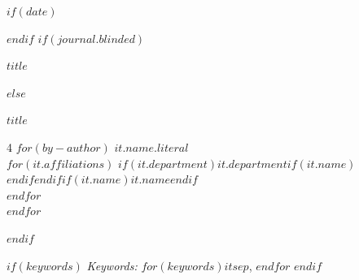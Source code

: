 

\def\spacingset#1{\renewcommand{\baselinestretch}%
{#1}\small\normalsize} \spacingset{1}



$if(date)$
\date{$date$}
$endif$
$if(journal.blinded)$
\spacingset{.8}
\bigskip
\bigskip
\bigskip
\begin{center}
  {\LARGE\bf $title$}
\end{center}
\smallskip
\bigskip
\spacingset{1}
$else$
\begin{center}
  {\LARGE\bf $title$}
\end{center}
\smallskip

\begingroup
\scriptsize %
\begin{multicols}{4}
$for(by-author)$
\textbf{$it.name.literal$}\\
$for(it.affiliations)$
  $if(it.department)$$it.department$$if(it.name)$\\$endif$$endif$$if(it.name)$$it.name$$endif$\\
$endfor$\\[0.6em]
$endfor$
\end{multicols}
\endgroup

\bigskip
$endif$

\bigskip
\bigskip
\begin{abstract}
$abstract$
\end{abstract}

$if(keywords)$
\noindent%
{\it Keywords:} $for(keywords)$$it$$sep$, $endfor$
\vfill
$endif$

\newpage
\spacingset{1.15} %

